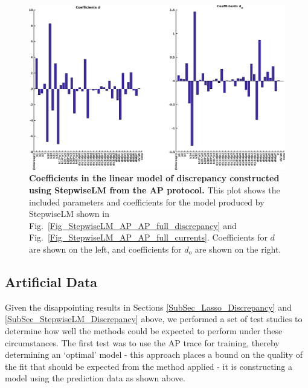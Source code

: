 \documentclass[11pt,a4paper,oneside]{article}
\begin{document}
\clearpage

\begin{figure}[t]
\begin{center}
\includegraphics[scale=0.42]{Figures/StepwiseLM_AP_AP_full_coefficients.png}
\caption{\textbf{Coefficients in the linear model of discrepancy constructed using StepwiseLM from the AP protocol.} This plot shows the included parameters and coefficients for the model produced by StepwiseLM shown in Fig.~\ref{Fig_StepwiseLM_AP_AP_full_discrepancy} and Fig.~\ref{Fig_StepwiseLM_AP_AP_full_currents}. Coefficients for $d$ are shown on the left, and coefficients for $d_o$ are shown on the right.} 
\label{Fig_StepwiseLM_AP_AP_full_coefficients}
\end{center}
\end{figure}

\clearpage

\subsection{Artificial Data}
Given the disappointing results in Sections \ref{SubSec_Lasso_Discrepancy} and \ref{SubSec_StepwiseLM_Discrepancy} above, we performed a set of test studies to determine how well the methods could be expected to perform under these circumstances. The first test was to use the AP trace for training, thereby determining an `optimal' model - this approach places a bound on the quality of the fit that should be expected from the method applied - it is constructing a model using the prediction data as shown above. 
\end{document}
